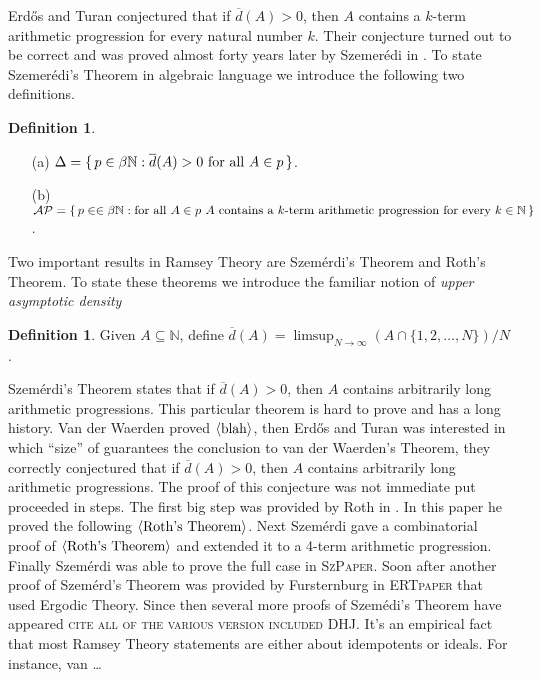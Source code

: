 \documentclass[12pt]{article}
\theoremstyle{plain}
\theoremstyle{definition}
\newtheorem{defn}[thm]{Definition}
\newcommand{\bbN}{\mathbb{N}}
\newcommand{\la}{\langle}
\newcommand{\ra}{\rangle}
\begin{document}
Erd\H{o}s and Turan conjectured that if $\overline{d}(A) > 0$, then
$A$ contains a $k$-term arithmetic progression for every natural
number $k$.
Their conjecture turned out to be correct and was proved almost forty
years later by Szemer\'{e}di in \cite{Szemeredi:1975uq}. 
To state Szemer\'{e}di's Theorem in algebraic language we introduce
the following two definitions.
  \begin{defn}
    \begin{itemize}
      \item[(a)] $\Delta = \{\, p \in \beta\bbN : \overline{d}(A) > 0
        \hbox{ for all } A \in p \,\}$.
      \item[(b)] $\mathcal{AP} = \{\, p \in \in \beta\bbN : \hbox{for
          all $A \in p$ } A \hbox{ contains a $k$-term arithmetic
          progression for every $k \in \bbN$} \,\}$.
    \end{itemize}
  \end{defn}

Two important results in Ramsey Theory are Szem\'{e}rdi's Theorem and
Roth's Theorem. 
To state these theorems we introduce the familiar notion of \textsl{upper
asymptotic density}
  \begin{defn}
    Given $A \subseteq \bbN$, define $\overline{d}(A) = \limsup_{N \to
      \infty} (A \cap \{1, 2, \ldots, N\})/ N$.
  \end{defn}
Szem\'{e}rdi's Theorem states that if $\overline{d}(A) > 0$, then $A$
contains arbitrarily long arithmetic progressions. 
This particular theorem is hard to prove and has a long history. 
Van der Waerden proved $\la\hbox{blah}\ra$, then Erd\H{o}s and Turan
was interested in which ``size'' of guarantees the conclusion to van
der Waerden's Theorem, they correctly conjectured that if
$\overline{d}(A) >0$, then $A$ contains arbitrarily long arithmetic
progressions. 
The proof of this conjecture was not immediate put proceeded in
steps. 
The first big step was provided by Roth in \cite{Roth:1953fk}. 
In this paper he proved the following $\la\hbox{Roth's Theorem}\ra$.
Next Szem\'{e}rdi gave a combinatorial proof of $\la\hbox{Roth's
  Theorem}\ra$ and extended it to a 4-term arithmetic progression. 
Finally Szem\'{e}rdi was able to prove the full case in
\textsc{SzPaper}. 
Soon after another proof of Szem\'{e}rd's Theorem was provided by
Fursternburg in \textsc{ERTpaper} that used Ergodic Theory. 
Since then several more proofs of Szem\'{e}di's Theorem have appeared
\textsc{cite all of the various version included DHJ}. 
It's an empirical fact that most Ramsey Theory statements are either
about idempotents or ideals.
For instance, van \dots




\end{document}
